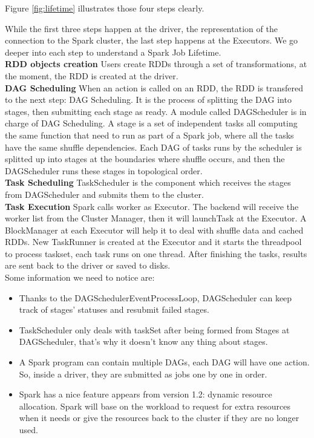 Figure \ref{fig:lifetime} illustrates those four steps clearly.

While the first three steps happen at the driver, the representation of the connection to the Spark cluster, the last step happens at the Executors. We go deeper into each step to understand a Spark Job Lifetime.\\

\textbf{RDD objects creation} Users create RDDs through a set of transformations, at the moment, the RDD is created at the driver.\\
\textbf{DAG Scheduling} When an action is called on an RDD, the RDD is transfered to the next step: DAG Scheduling. It is the process of splitting the DAG into stages, then submitting each stage as ready.
A module called DAGScheduler is in charge of DAG Scheduling. A stage is a set of independent tasks all computing the same function that need to run as part of a Spark job, where all the tasks have the same shuffle dependencies. Each DAG of tasks runs by the scheduler is splitted up into stages at the boundaries where shuffle occurs, and then the DAGScheduler runs these stages in topological order.\\
\textbf{Task Scheduling} TaskScheduler is the component which receives the stages from DAGScheduler and submits them to the cluster.\\
\textbf{Task Execution} Spark calls worker as Executor. The backend will receive the worker list from the Cluster Manager, then it will launchTask at the Executor. A BlockManager at each Executor will help it to deal with shuffle data and cached RDDs. New TaskRunner is created at the Executor and it starts the threadpool to process taskset, each task runs on one thread. After finishing the tasks, results are sent back to the driver or saved to disks.\\

Some information we need to notice are:
\begin{itemize}
\item Thanks to the DAGSchedulerEventProcessLoop, DAGScheduler can keep track of stages’ statuses and resubmit failed stages.
\item TaskScheduler only deals with taskSet after being formed from Stages at DAGScheduler,  that’s why it doesn’t know any thing about stages.
\item A Spark program can contain multiple DAGs, each DAG will have one action. So, inside a driver, they are submitted as jobs one by one in order.
\item Spark has a nice feature appears from version 1.2: dynamic resource allocation. Spark will base on the workload to request for extra resources when it needs or give the resources back to the cluster if they are no longer used.
\end{itemize}

